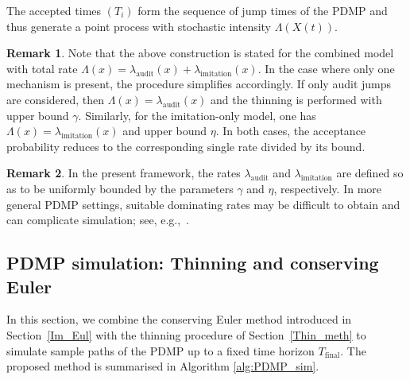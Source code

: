 \documentclass[11pt]{article}
\theoremstyle{plain}
\theoremstyle{definition}
\newtheorem{remark}{Remark}
\newcommand{\1}{\mathbf{1}}
\begin{document}
\noindent The accepted times $(T_i)$ form the sequence of jump times of the PDMP and thus generate a point process with stochastic intensity $\Lambda(X(t))$.

\begin{remark}
Note that the above construction is stated for the combined model with total rate $\Lambda(x) = \lambda_{\mathrm{audit}}(x) + \lambda_{\mathrm{imitation}}(x)$. 
In the case where only one mechanism is present, the procedure simplifies accordingly. 
If only audit jumps are considered, then $\Lambda(x) = \lambda_{\mathrm{audit}}(x)$ and the thinning is performed with upper bound $\gamma$. Similarly, for the imitation-only model, one has $\Lambda(x) = \lambda_{\mathrm{imitation}}(x)$ and upper bound $\eta$. In both cases, the acceptance probability reduces to the corresponding single rate divided by its bound.
\end{remark}

\begin{remark}
In the present framework, the rates $\lambda_{\mathrm{audit}}$ and $\lambda_{\mathrm{imitation}}$ are defined so as to be uniformly bounded by the parameters $\gamma$ and $\eta$, respectively. 
In more general PDMP settings, suitable dominating rates may be difficult to obtain and can complicate simulation; see, e.g.,~\mbox{\cite{BERTAZZI202291, lemaire2018exact}}.
\end{remark}

\subsection{PDMP simulation: Thinning and conserving Euler}
\label{Final_PDMP_sim}

In this section, we combine the conserving Euler method introduced in Section~\ref{Im_Eul} with the thinning procedure of Section~\ref{Thin_meth} to simulate sample paths of the PDMP up to a fixed time horizon $T_{\mathrm{final}}$. The proposed method is summarised in Algorithm \ref{alg:PDMP_sim}.
\end{document}
